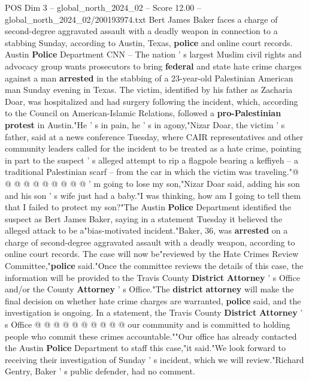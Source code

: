 \begin{textsample}{POS Dim 3 – global\_north\_2024\_02 – Score 12.00 – global\_north\_2024\_02/200193974.txt}  \label{ex:f3_pos_256}
Bert James Baker faces a charge of second-degree aggravated assault with a deadly weapon in connection to a stabbing Sunday, according to Austin, Texas, \textbf{police} and online court records.
Austin \textbf{Police} Department CNN -- The nation ' s largest Muslim civil rights and advocacy group wants prosecutors to bring \textbf{federal} and state hate crime charges against a man \textbf{arrested} in the stabbing of a 23-year-old Palestinian American man Sunday evening in Texas.
The victim, identified by his father as Zacharia Doar, was hospitalized and had surgery following the incident, which, according to the Council on American-Islamic Relations, followed a \textbf{pro-Palestinian} \textbf{protest} in Austin."He ' s in pain, he ' s in agony,"Nizar Doar, the victim ' s father, said at a news conference Tuesday, where CAIR representatives and other community leaders called for the incident to be treated as a hate crime, pointing in part to the suspect ' s alleged attempt to rip a flagpole bearing a keffiyeh -- a traditional Palestinian scarf -- from the car in which the victim was traveling."@ @ @ @ @ @ @ @ @ @ ' m going to lose my son,"Nizar Doar said, adding his son and his son ' s wife just had a baby."I was thinking, how am I going to tell them that I failed to protect my son?"The Austin \textbf{Police} Department identified the suspect as Bert James Baker, saying in a statement Tuesday it believed the alleged attack to be a"bias-motivated incident."Baker, 36, was \textbf{arrested} on a charge of second-degree aggravated assault with a deadly weapon, according to online court records.
The case will now be"reviewed by the Hate Crimes Review Committee,"\textbf{police} said."Once the committee reviews the details of this case, the information will be provided to the Travis County \textbf{District} \textbf{Attorney} ' s Office and/or the County \textbf{Attorney} ' s Office."The \textbf{district} \textbf{attorney} will make the final decision on whether hate crime charges are warranted, \textbf{police} said, and the investigation is ongoing.
In a statement, the Travis County \textbf{District} \textbf{Attorney} ' s Office @ @ @ @ @ @ @ @ @ @ our community and is committed to holding people who commit these crimes accountable.""Our office has already contacted the Austin \textbf{Police} Department to staff this case,"it said."We look forward to receiving their investigation of Sunday ' s incident, which we will review."Richard Gentry, Baker ' s public defender, had no comment.

\end{textsample}
